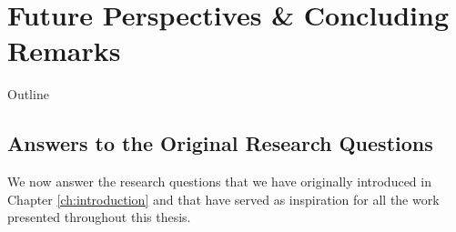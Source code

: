 
\chapter{Future Perspectives \& Concluding Remarks} %
\label{ch:upside_down_rl} %

\begin{remark}{Outline}

	


\end{remark}



\section{Answers to the Original Research Questions}

We now answer the research questions that we have originally introduced in Chapter \ref{ch:introduction} and that have served as inspiration for all the work presented throughout this thesis.

